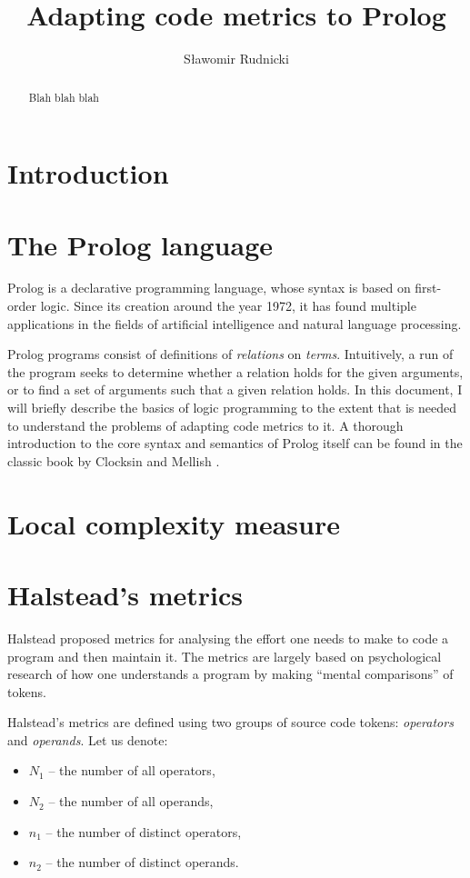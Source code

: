\documentclass[11pt,a4paper,twoside]{article}
\author{Sławomir Rudnicki}
\title{Adapting code metrics to Prolog}
\date{}
\begin{document}
\maketitle
\begin{abstract}
Blah blah blah
\end{abstract}
\begin{multicols}{2}


\section{Introduction}

\section{The Prolog language}

Prolog is a declarative programming language, whose syntax is based on
first-order logic. Since its creation around the year 1972, it has
found multiple applications in the fields of artificial intelligence
and natural language processing.

Prolog programs consist of definitions of \emph{relations} on
\emph{terms}. Intuitively, a run of the program seeks to determine
whether a relation holds for the given arguments, or to find a set of
arguments such that a given relation holds. In this document, I will
briefly describe the basics of logic programming to the extent that is
needed to understand the problems of adapting code metrics to it. A
thorough introduction to the core syntax and semantics of Prolog
itself can be found in the classic book by Clocksin and Mellish
\cite{clocksin}.



\section{Local complexity measure}


\section{Halstead's metrics}

Halstead \cite{halstead} proposed metrics for analysing the effort one
needs to make to code a program and then maintain it. The metrics are
largely based on psychological research of how one understands a
program by making ``mental comparisons'' of tokens.

Halstead's metrics are defined using two groups of source code tokens:
\emph{operators} and \emph{operands}. Let us denote:
\begin{itemize}
\item $N_1$ -- the number of all operators, 
\item $N_2$ -- the number of all operands, 
\item $n_1$ -- the number of distinct operators, 
\item $n_2$ -- the number of distinct operands.
\end{itemize}


\end{multicols}
\end{document}

